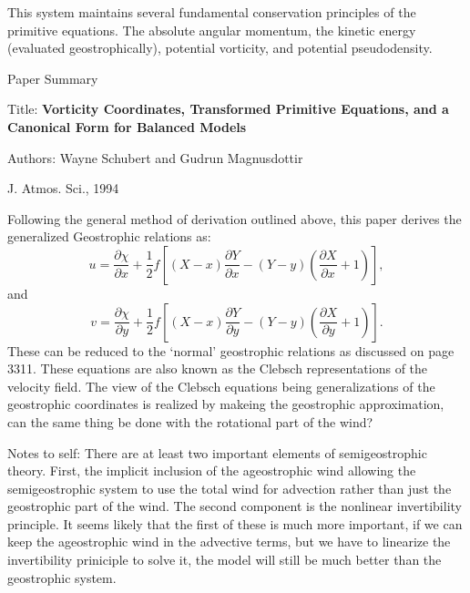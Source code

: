 \documentclass[11pt]{report}
\begin{document}
\begin{enumerate}
This system maintains several fundamental conservation principles of the primitive equations.  The
absolute angular momentum, the kinetic energy (evaluated geostrophically), potential vorticity, and
potential pseudodensity.  

\end{enumerate}

Paper Summary

Title: \textbf{Vorticity Coordinates, Transformed Primitive Equations, and a Canonical Form for
Balanced Models}

Authors: Wayne Schubert and Gudrun Magnusdottir

J. Atmos. Sci., 1994

\vspace{0.25in}

Following the general method of derivation outlined above, this paper derives the generalized 
Geostrophic relations as: 
\begin{equation}
    u=\frac{\partial \chi}{\partial x}+\frac{1}{2}f\left[(X-x)\frac{\partial Y}{\partial x}
    -(Y-y)\left(\frac{\partial X}{\partial x}+1\right)\right],
\end{equation}
and 
\begin{equation}
    v=\frac{\partial \chi}{\partial y}+\frac{1}{2}f\left[(X-x)\frac{\partial Y}{\partial y}
    -(Y-y)\left(\frac{\partial X}{\partial y}+1\right)\right].
\end{equation}
These can be reduced to the `normal' geostrophic relations as discussed on page 3311. 
These equations are also known as the Clebsch representations of the velocity field.  The view of
the Clebsch equations being generalizations of the geostrophic coordinates is realized by makeing
the geostrophic approximation, can the same thing be done with the rotational part of the wind?    






Notes to self:  There are at least two important elements of semigeostrophic theory.  First, the
implicit inclusion of the ageostrophic wind allowing the semigeostrophic system to use the total
wind for advection rather than just the geostrophic part of the wind.  The second component is the
nonlinear invertibility principle. It seems likely that the first of these is much more important,
if we can keep the ageostrophic wind in the advective terms, but we have to linearize the
invertibility priniciple to solve it, the model will still be much better than the geostrophic
system.  
\end{document}
